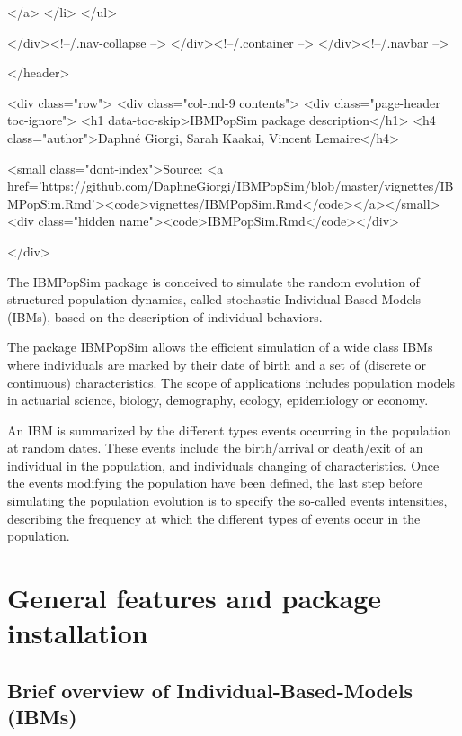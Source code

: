   </a>
</li>
      </ul>
      
    </div><!--/.nav-collapse -->
  </div><!--/.container -->
</div><!--/.navbar -->

      

      </header>


<div class="row">
  <div class="col-md-9 contents">
    <div class="page-header toc-ignore">
      <h1 data-toc-skip>IBMPopSim package description</h1>
                        <h4 class="author">Daphné Giorgi, Sarah Kaakai, Vincent Lemaire</h4>
            
      
      <small class="dont-index">Source: <a href='https://github.com/DaphneGiorgi/IBMPopSim/blob/master/vignettes/IBMPopSim.Rmd'><code>vignettes/IBMPopSim.Rmd</code></a></small>
      <div class="hidden name"><code>IBMPopSim.Rmd</code></div>

    </div>

    
    
The IBMPopSim package is conceived to simulate the random evolution of structured population dynamics, called stochastic Individual Based Models (IBMs), based on the description of individual behaviors.

The package IBMPopSim allows the efficient simulation of a wide class IBMs where individuals are marked by their date of birth and a set of (discrete or continuous) characteristics. The scope of applications includes population models in actuarial science, biology, demography, ecology, epidemiology or economy.

An IBM is summarized by the different types events occurring in the population at random dates. These events include the birth/arrival or death/exit of an individual in the population, and individuals changing of characteristics.
Once the events modifying the population have been defined, the last step before simulating the population evolution is to specify the so-called events intensities, describing the frequency at which the different types of events occur in the population.

\hypertarget{general-features-and-package-installation}{%
\section{General features and package installation}\label{general-features-and-package-installation}}

\hypertarget{brief-overview-of-individual-based-models-ibms}{%
\subsection{Brief overview of Individual-Based-Models (IBMs)}\label{brief-overview-of-individual-based-models-ibms}}

